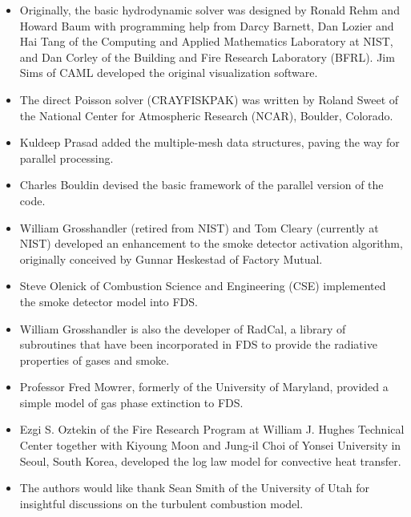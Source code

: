 \documentclass[11pt]{book}
\begin{document}
\begin{itemize}
\item Originally, the basic hydrodynamic solver was designed by Ronald Rehm and Howard Baum with programming help from Darcy Barnett, Dan Lozier and Hai Tang of the Computing and Applied Mathematics Laboratory at NIST, and Dan Corley of the Building and Fire Research Laboratory (BFRL). Jim Sims of CAML developed the original visualization software.
\item The direct Poisson solver (CRAYFISKPAK) was written by Roland Sweet of the National Center for Atmospheric Research (NCAR), Boulder, Colorado.
\item Kuldeep Prasad added the multiple-mesh data structures, paving the way for parallel processing.
\item Charles Bouldin devised the basic framework of the parallel version of the code.
\item William Grosshandler (retired from NIST) and Tom Cleary (currently at NIST) developed an enhancement to the smoke detector activation algorithm, originally conceived by Gunnar Heskestad of Factory Mutual.
\item Steve Olenick of Combustion Science and Engineering (CSE) implemented the smoke detector model into FDS.
\item William Grosshandler is also the developer of RadCal, a library of subroutines that have been incorporated in FDS to provide the radiative properties of gases and smoke.
\item Professor Fred Mowrer, formerly of the University of Maryland, provided a simple model of gas phase extinction to FDS.
\item Ezgi S. Oztekin of the Fire Research Program at William J. Hughes Technical Center together with Kiyoung Moon and Jung-il Choi of Yonsei University in Seoul, South Korea, developed the log law model for convective heat transfer.
\item The authors would like thank Sean Smith of the University of Utah for insightful discussions on the turbulent combustion model.
\end{itemize}

\cleardoublepage
{}
{}
\tableofcontents

\cleardoublepage
{}
{}
\listoffigures

\cleardoublepage
{}
{}
\listoftables


\mainmatter















\appendix



\end{document}
